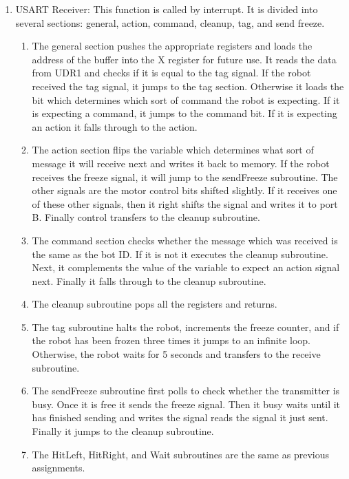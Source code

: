 \documentclass[12pt,letterpaper]{article}
\begin{document}
\begin{enumerate}
\begin{enumerate}
\item USART Receiver: This function is called by interrupt. It is divided into several sections: general, action, command, cleanup, tag, and send freeze.
    \begin{enumerate}
    \item The general section pushes the appropriate registers and loads the address of the buffer into the X register for future use. It reads the data from UDR1 and checks if it is equal to the tag signal. If the robot received the tag signal, it jumps to the tag section. Otherwise it loads the bit which determines which sort of command the robot is expecting. If it is expecting a command, it jumps to the command bit. If it is expecting an action it falls through to the action.
    \item The action section flips the variable which determines what sort of message it will receive next and writes it back to memory. If the robot receives the freeze signal, it will jump to the sendFreeze subroutine. The other signals are the motor control bits shifted slightly. If it receives one of these other signals, then it right shifts the signal and writes it to port B. Finally control transfers to the cleanup subroutine.
    \item The command section checks whether the message which was received is the same as the bot ID. If it is not it executes the cleanup subroutine. Next, it complements the value of the variable to expect an action signal next. Finally it falls through to the cleanup subroutine.
    \item The cleanup subroutine pops all the registers and returns.
    \item The tag subroutine halts the robot, increments the freeze counter, and if the robot has been frozen three times it jumps to an infinite loop. Otherwise, the robot waits for 5 seconds and transfers to the receive subroutine.
    \item The sendFreeze subroutine first polls to check whether the transmitter is busy. Once it is free it sends the freeze signal. Then it busy waits until it has finished sending and writes the signal reads the signal it just sent. Finally it jumps to the cleanup subroutine.
    \item The HitLeft, HitRight, and Wait subroutines are the same as previous assignments.
    \end{enumerate}
\end{enumerate}


\end{enumerate}
\end{document}
